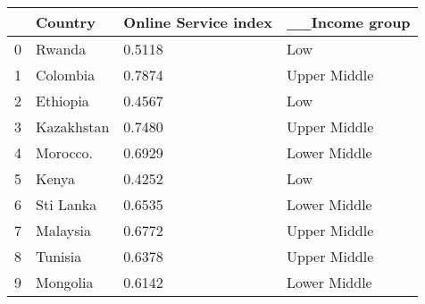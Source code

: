 \begin{tabular}{llll}
\toprule
{} &     Country & Online Service index & \_\_Income group \\
\midrule
0 &      Rwanda &               0.5118 &            Low \\
1 &    Colombia &               0.7874 &   Upper Middle \\
2 &    Ethiopia &               0.4567 &            Low \\
3 &  Kazakhstan &               0.7480 &   Upper Middle \\
4 &    Morocco. &               0.6929 &   Lower Middle \\
5 &       Kenya &               0.4252 &            Low \\
6 &   Sti Lanka &               0.6535 &   Lower Middle \\
7 &    Malaysia &               0.6772 &   Upper Middle \\
8 &     Tunisia &               0.6378 &   Upper Middle \\
9 &    Mongolia &               0.6142 &   Lower Middle \\
\bottomrule
\end{tabular}

